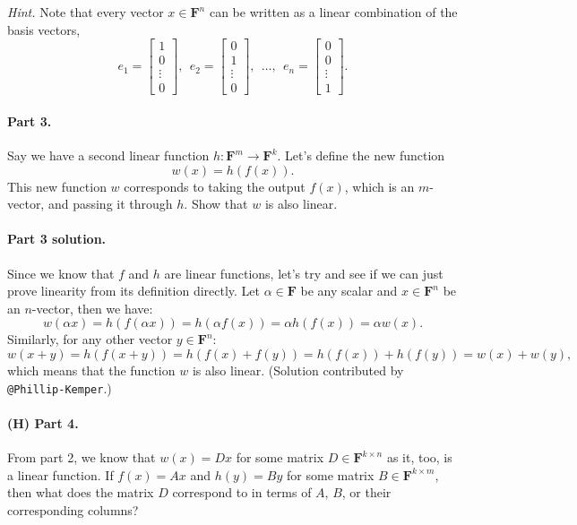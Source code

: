 \documentclass[12pt,hidelinks]{article}
\newcommand{\field}{\mathbf{F}}
\begin{document}
\emph{Hint.} Note that every vector $x \in \field^n$ can be written
as a linear combination of the basis vectors,
\[
    e_1 = \begin{bmatrix}
        1\\0\\\vdots\\0
    \end{bmatrix},
    ~~
    e_2 = 
    \begin{bmatrix}
        0\\1\\\vdots\\0
    \end{bmatrix},
    ~~
    \dots,
    ~~
    e_n = 
    \begin{bmatrix}
        0\\0\\\vdots\\1
    \end{bmatrix}.
\]

\paragraph{Part 3.} Say we have a second linear function $h: \field^m \to
\field^k$. Let's define the new function
\[
    w(x) = h(f(x)).
\]
This new function $w$ corresponds to taking the output $f(x)$, which is an
$m$-vector, and passing it through $h$. Show that $w$ is also linear.

\begin{solution}
\paragraph{Part 3 solution.} Since we know that $f$ and $h$ are linear
functions, let's try and see if we can just prove linearity from its definition
directly. Let $\alpha \in \field$ be any scalar and $x \in \field^n$ be an
$n$-vector, then we have:
\[
    w(\alpha x) = h(f(\alpha x)) = h(\alpha f(x)) = \alpha h(f(x)) = \alpha w(x).
\]
Similarly, for any other vector $y \in \field^n$:
\[
    w(x + y) = h(f(x + y)) = h(f(x) + f(y)) = h(f(x)) + h(f(y)) = w(x) + w(y),
\]
which means that the function $w$ is also linear. (Solution contributed by
\verb|@Phillip-Kemper|.)

\end{solution}

\paragraph{(H) Part 4.} From part 2, we know that $w(x) = Dx$ for some matrix
$D \in \field^{k \times n}$ as it, too, is a linear function. If $f(x) = Ax$
and $h(y) = By$ for some matrix $B \in \field^{k\times m}$, then what does the
matrix $D$ correspond to in terms of $A$, $B$, or their corresponding columns?
\end{document}
